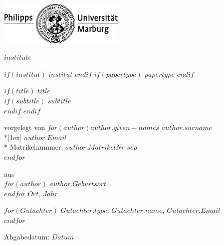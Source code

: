 




\pagestyle{scrheadings}

  \clearscrheadfoot
  \ihead[]{\headmark} %
  \chead[]{} %
  \ohead{} %
  \ofoot[]{\pagemark} %
  \setheadsepline{.2pt}
  \setfootsepline{.2pt}



\begin{titlepage}
\begin {center}
\sffamily
\setlength\parindent{0pt}

\includegraphics[width = 6cm]{images/pum_logo_sw.pdf} \par
\vspace{-.9cm} \hfill{\huge \bfseries $institute$}

\vfill
$if(institut)$ $institut$
$endif$
\vfill
$if(papertype)$ \Large $papertype$
$endif$
\vfill

$if(title)$
{\huge \bfseries $title$} \\[1ex]
$if(subtitle)$
{\Large \bfseries $subtitle$} \\[1cm]
$endif$
$endif$

\normalsize vorgelegt von
\vfill
$for(author)$\Large $author.given-names$ $author.surname$\\*[1ex]
\normalsize $author.Email$\\*
Matrikelnummer: $author.MatrikelNr$ $sep$\\[1cm]
$endfor$

\vfill
aus\\
$for(author)$ $author.Geburtsort$\\
$endfor$
\vfill
$Ort$, $Jahr$
\vfill

$for(Gutachter)$
$Gutachter.type$: $Gutachter.name$, $Gutachter.Email$\\
$endfor$

\vfill

Abgabedatum: $Datum$
\end{center}
\end{titlepage}



